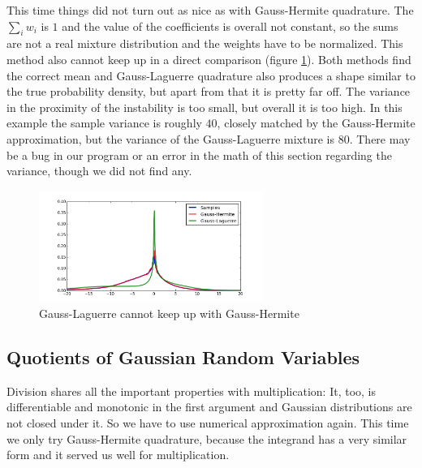 \documentclass[11pt,a4paper]{book}
\begin{document}
This time things did not turn out as nice as with Gauss-Hermite quadrature. The
$\sum_{i} w_{i}$ is $1$ and the value of the coefficients is overall not
constant, so the sums are not a real mixture distribution and the weights have
to be normalized. This method also cannot keep up in a direct comparison (figure
\ref{fig:hermite-laguerre}). Both methods find the correct mean and
Gauss-Laguerre quadrature also produces a shape similar to the true probability
density, but apart from that it is pretty far off. The variance in the proximity
of the instability is too small, but overall it is too high. In this example the
sample variance is roughly $40$, closely matched by the Gauss-Hermite
approximation, but the variance of the Gauss-Laguerre mixture is $80$. There may
be a bug in our program or an error in the math of this section regarding the
variance, though we did not find any.
\begin{figure}[h]
  \centering
  \includegraphics[width=0.65\textwidth]{thesis/theory/hermite-laguerre}
  \caption{Gauss-Laguerre cannot keep up with Gauss-Hermite}
  \label{fig:hermite-laguerre}
\end{figure}

\subsection{Quotients of Gaussian Random Variables}
\label{sec:gaussians-quotients}

Division shares all the important properties with multiplication: It, too, is
differentiable and monotonic in the first argument and Gaussian distributions
are not closed under it. So we have to use numerical approximation again. This
time we only try Gauss-Hermite quadrature, because the integrand has a very
similar form and it served us well for multiplication.
\end{document}
